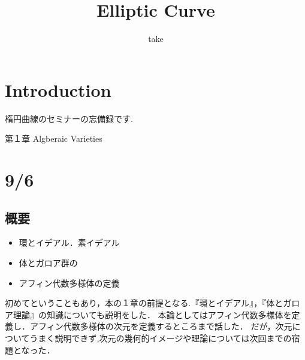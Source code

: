 \documentclass{ujarticle}
\title{Elliptic Curve}
\author{take}
\begin{document}
\maketitle
\tableofcontents


\section{Introduction}
\label{sec:Introduction}

楕円曲線のセミナーの忘備録です.
\begin{description}
  \setlength{\parskip}{0cm} %
  \setlength{\itemsep}{0cm} %
  \item[9/6] 第１章 Algberaic Varieties
\end{description}

\section{9/6}
\label{sec:9/6}

\subsection{概要}
\label{sub:概要}
\begin{itemize}
  \setlength{\parskip}{0cm} %
  \setlength{\itemsep}{0cm} %
  \item 環とイデアル．素イデアル
  \item 体とガロア群の
  \item アフィン代数多様体の定義
\end{itemize}

初めてということもあり，本の１章の前提となる.『環とイデアル』，『体とガロア理論』の知識についても説明をした．
本論としてはアフィン代数多様体を定義し．アフィン代数多様体の次元を定義するところまで話した．
だが，次元についてうまく説明できず,次元の幾何的イメージや理論については次回までの宿題となった．
\end{document}
